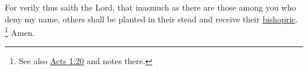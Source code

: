 		For verily thus saith the Lord, that inasmuch as there are those among you who deny my name, others shall be planted in their stead and receive their \hyperref[BISHOPRIC]{bishopric}.%
			\footnote{%
				See also \hyperref[ACTS-1-20]{Acts 1:20} and notes there.
				} 
		Amen.

